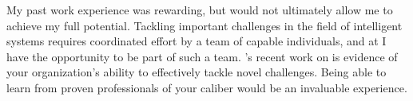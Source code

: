 \begin{cvletter}

	My past work experience was rewarding, but would not ultimately
	allow me to achieve my full potential.
	Tackling important challenges in the field of
	intelligent systems requires coordinated effort by a team of
  capable individuals, and at \clcompany{} I have the opportunity to be
  part of such a team. \clcompany's recent work on \clcompany{} is
	evidence of your organization's ability to effectively tackle novel
	challenges. Being able to learn from proven professionals of your
	caliber would be an invaluable experience.

\end{cvletter}
